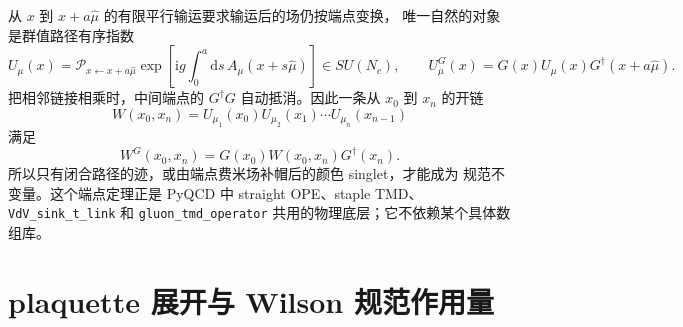 \documentclass[UTF8,11pt,oneside]{ctexbook}
\newcommand{\dd}{\mathrm{d}}
\begin{document}
从 \(x\) 到 \(x+a\hat\mu\) 的有限平行输运要求输运后的场仍按端点变换，
唯一自然的对象是群值路径有序指数
\begin{equation}
 U_\mu(x)=\mathcal P_{x\leftarrow x+a\hat\mu}\exp\left[\mathrm{i}g
 \int_0^a\dd s\,A_\mu(x+s\hat\mu)\right]
 \in SU(N_c),
 \qquad
 U_\mu^G(x)=G(x)U_\mu(x)G^\dagger(x+a\hat\mu).
 \label{eq:deep-link}
\end{equation}
把相邻链接相乘时，中间端点的 \(G^\dagger G\) 自动抵消。因此一条从
\(x_0\) 到 \(x_n\) 的开链
\begin{equation}
 W(x_0,x_n)=U_{\mu_1}(x_0)U_{\mu_2}(x_1)\cdots
 U_{\mu_n}(x_{n-1})
 \label{eq:deep-open-line}
\end{equation}
满足
\begin{equation}
 W^G(x_0,x_n)=G(x_0)W(x_0,x_n)G^\dagger(x_n).
 \label{eq:deep-open-line-transform}
\end{equation}
所以只有闭合路径的迹，或由端点费米场补帽后的颜色 singlet，才能成为
规范不变量。这个端点定理正是 PyQCD 中 straight OPE、staple TMD、
\texttt{VdV\_sink\_t\_link} 和 \texttt{gluon\_tmd\_operator}
共用的物理底层；它不依赖某个具体数组库。

\section{plaquette 展开与 Wilson 规范作用量}
\end{document}
